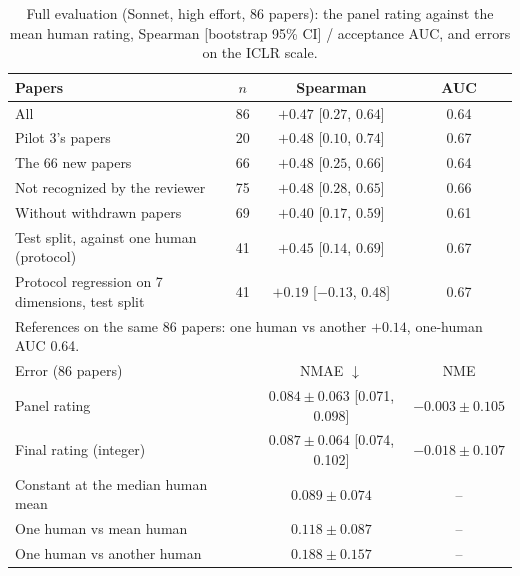 \documentclass[11pt,a4paper]{article}
\begin{document}
\begin{table}[t]
\centering\small
\caption{Full evaluation (Sonnet, high effort, 86 papers): the panel rating against the mean
human rating, Spearman [bootstrap 95\% CI] / acceptance AUC, and errors on the ICLR scale.}
\label{tab:full}
\setlength{\tabcolsep}{4pt}\footnotesize
\begin{tabular}{lccc}
\toprule
Papers & $n$ & Spearman & AUC\\
\midrule
All & 86 & $\mathbf{+0.47}$ [$0.27$, $0.64$] & 0.64\\
Pilot 3's papers & 20 & $+0.48$ [$0.10$, $0.74$] & 0.67\\
The 66 new papers & 66 & $+0.48$ [$0.25$, $0.66$] & 0.64\\
Not recognized by the reviewer & 75 & $+0.48$ [$0.28$, $0.65$] & 0.66\\
Without withdrawn papers & 69 & $+0.40$ [$0.17$, $0.59$] & 0.61\\
Test split, against one human (protocol) & 41 & $+0.45$ [$0.14$, $0.69$] & 0.67\\
Protocol regression on 7 dimensions, test split & 41 & $+0.19$ [$-0.13$, $0.48$] & 0.67\\
\midrule
\multicolumn{4}{l}{References on the same 86 papers: one human vs another $+0.14$, one-human AUC 0.64.}\\
\midrule
Error (86 papers) & & NMAE $\downarrow$ & NME\\
\midrule
Panel rating & & $\mathbf{0.084}\pm0.063$ [0.071, 0.098] & $-0.003\pm0.105$\\
Final rating (integer) & & $0.087\pm0.064$ [0.074, 0.102] & $-0.018\pm0.107$\\
Constant at the median human mean & & $0.089\pm0.074$ & --\\
One human vs mean human & & $0.118\pm0.087$ & --\\
One human vs another human & & $0.188\pm0.157$ & --\\
\bottomrule
\end{tabular}
\end{table}
\end{document}
